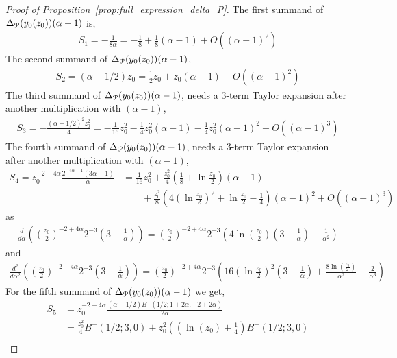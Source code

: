 \begin{proof}[Proof of Proposition~\ref{prop:full_expression_delta_P}]
The first summand of $\Delta_{{\mathcal P}}(y_0(z_0))(\alpha-1)$ is,
\begin{align*}
	S_1 = -\frac{1}{8 \alpha} = -\frac{1}{8}+\frac{1}{8}(\alpha-1) +O( (\alpha-1)^2)
\end{align*}
The second summand of $\Delta_{{\mathcal P}}(y_0(z_0))(\alpha-1)$,
\begin{align*}
	S_2 = (\alpha-1/2)z_0 = \frac{1}{2}z_0 +z_0 (\alpha-1)+O( (\alpha-1)^2)
\end{align*}
The third summand of $\Delta_{{\mathcal P}}(y_0(z_0))(\alpha-1)$, needs  a 3-term Taylor expansion after another multiplication with $(\alpha-1)$,
\begin{align*}
	S_3 = - \frac{(\alpha - 1/2)^2 z_0^2}{4} = -\frac{1}{16}z_0^2 -\frac{1}{4}z_0^2(\alpha-1)-\frac{1}{4}z_0^2(\alpha-1)^2+O( (\alpha-1)^3)
\end{align*}
The fourth summand of $\Delta_{{\mathcal P}}(y_0(z_0))(\alpha-1)$, needs a  3-term Taylor expansion after another multiplication with $(\alpha-1)$,
\begin{align*}
	S_4 = z_0^{-2 + 4 \alpha} \frac{2^{-4 \alpha-1} (3 \alpha - 1)}{\alpha} &= \frac{1}{16}z_0^2 +\frac{z_0^2}{4}\left(\frac{1}{8}+\ln\frac{z_0}{2}\right)(\alpha-1)\\
&\qquad+\frac{z_0^2}{8}\left(4\left(\ln\frac{z_0}{2}\right)^2+\ln\frac{z_0}{2} - \frac{1}{4}\right)(\alpha-1)^2+O( (\alpha-1)^3)
\end{align*}
as
\begin{align*}
\frac{d}{d\alpha}\left( \left(\frac{z_0}{2}\right)^{-2+4\alpha} 2^{-3}\left(3-\frac{1}{\alpha}\right) \right) = \left(\frac{z_0}{2}\right)^{-2+4\alpha}2^{-3}\left(4\ln\left(\frac{z_0}{2}\right)\left(3-\frac{1}{\alpha}\right)+\frac{1}{\alpha^2}\right)
\end{align*}
and
\begin{align*}
\frac{d^2}{d\alpha^2}\left( \left(\frac{z_0}{2}\right)^{-2+4\alpha} 2^{-3}\left(3-\frac{1}{\alpha}\right) \right) = \left( \frac{z_0}{2} \right)^{-2+4\alpha}2^{-3}\left(16\left(\ln\frac{z_0}{2}\right)^2\left(3-\frac{1}{\alpha}\right)+\frac{8\ln(\frac{z_0}{2})}{\alpha^2}-\frac{2}{\alpha^3} \right)
\end{align*}
For the fifth summand of $\Delta_{{\mathcal P}}(y_0(z_0))(\alpha-1)$ we get,
\begin{align*}
	S_5 &= z_0^{-2 + 4 \alpha} \frac{(\alpha - 1/2 ) B^-(1/2; 1 + 2 \alpha, -2 + 2 \alpha)}{2\alpha} \\
	&= \frac{z_0^2}{4} B^-(1/2;3,0) + z_0^2\left(\left(\ln(z_0)+\frac{1}{4}\right) B^-(1/2;3,0) \right. \\

\end{align*}
\end{proof}

